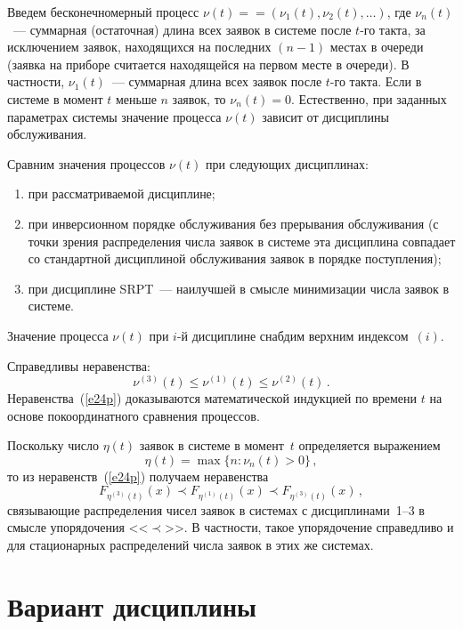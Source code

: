 \begin{multicols}{2}
Введем бесконечномерный процесс
$\nu(t) =$\linebreak $= (\nu_1(t),\nu_2(t),\ldots)$,
где $\nu_n(t)$~--- суммарная (остаточная) длина всех заявок в
системе после $t$-го такта, за исключением заявок, находящихся
на последних $(n-1)$ местах в очереди (заявка на приборе считается
находящейся на первом месте в очереди).
В частности, $\nu_1(t)$~--- суммарная длина всех заявок после
$t$-го такта.
Если в системе в момент $t$ меньше $n$ заявок, то $\nu_n(t)=0$.
Естественно, при заданных параметрах системы значение процесса
$\nu(t)$ зависит от дисциплины обслуживания.

Сравним значения процессов $\nu(t)$ при сле\-ду\-ющих дисциплинах:
\begin{enumerate}[(1)]
\item при рассматриваемой дисциплине;
\item
при инверсионном порядке обслуживания без прерывания
обслуживания (с точки зрения распределения числа заявок в
системе эта дисциплина совпадает со стандартной дисциплиной
обслуживания заявок в порядке поступления);
\item
 при дисциплине SRPT~--- наилучшей в смысле минимизации
числа заявок в системе.
\end{enumerate}

Значение процесса $\nu(t)$ при $i$-й дисциплине снабдим верхним
индексом~$(i)$.

Справедливы неравенства:
\begin{equation}
\nu^{(3)}(t)    \le \nu^{(1)}(t) \le \nu^{(2)}(t)\,.
\label{e24p}
\end{equation}
Неравенства~(\ref{e24p}) доказываются математической индукцией по времени
$t$ на основе покоординатного сравнения процессов.

Поскольку число $\eta(t)$ заявок в системе в момент~$t$ определяется
выражением
$$
\eta(t) = \max\{n: \nu_n(t)>0\}\,,
$$
то из неравенств~(\ref{e24p}) получаем неравенства
$$
F_{\eta^{(3)}(t)}(x) \prec F_{\eta^{(1)}(t)}(x) \prec F_{\eta^{(3)}(t)}(x)\,,
$$
связывающие распределения чисел заявок в системах с дисциплинами~1--3
в смысле упорядочения <<$\prec$>>.
В частности, такое упорядочение справедливо и для стационарных
распределений числа заявок в этих же системах.


\section{Вариант дисциплины}


\end{multicols}
